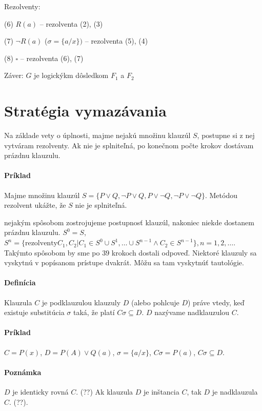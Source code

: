 \par Rezolventy: 
\par (6) $R(a)$ -- rezolventa (2), (3)
\par (7) $\neg R(a)$ ($\sigma = \{a / x \})$ -- rezolventa (5), (4)
\par (8) $\square$ -- rezolventa (6), (7)

\par Záver: $G$ je logickýkm dôsledkom $F_1$ a $F_2$

\section{Stratégia vymazávania}
Na základe vety o úplnosti, majme nejakú množinu klauzúl $S$, postupne si z nej
vytváram rezolventy. Ak nie je splniteľná, po konečnom počte krokov dostávam
prázdnu klauzulu.

\paragraph{Príklad} Majme množinu klauzúl $S=\{P\lor Q, \neg P\lor Q, P \lor
\neg Q, \neg P \lor \neg Q\}$. Metódou rezolvent ukážte, že $S$ nie je
splniteľná.

\par nejakým spôsobom zostrojujeme postupnosť klauzúl, nakoniec niekde dostanem
prázdnu klauzulu. 
$S^0 = S$, $S^n = \{ \mbox{rezolventy} C_1, C_2 | C_1 \in S^0 \cup S^1,
\ldots \cup S^{n-1} \land C_2 \in S^{n-1}\}, n=1, 2, \ldots$. Takýmto spôsobom
by sme po $39$ krokoch dostali odpoveď. Niektoré klauzuly sa vyskytnú v
popísanom prístupe dvakrát. Môžu sa tam vyskytnúť tautológie.


\paragraph{Definícia} Klauzula $C$ je podklauzulou klauzuly $D$ (alebo pohlcuje
$D$) práve vtedy, keď existuje substitúcia $\sigma$ taká, že platí $C\sigma
\subseteq D$. $D$ nazývame nadklauzulou $C$.

\paragraph{Príklad} $C = P(x)$, $D = P(A) \lor Q(a)$, $\sigma = \{a/x\}$,
$C\sigma = P(a)$, $C\sigma \subseteq D$.

\paragraph{Poznámka} $D$ je identicky rovná $C$. (??)
Ak klauzula $D$ je inštancia $C$, tak $D$ je nadklauzula $C$. (??). 

